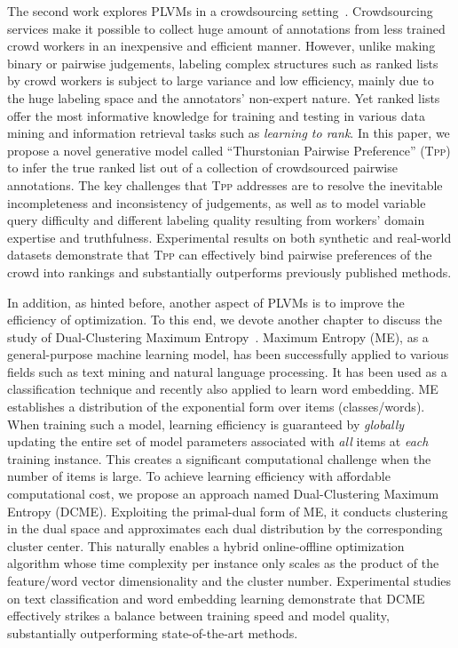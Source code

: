 The second work explores PLVMs in a crowdsourcing setting~\cite{wang2016tpp}.
Crowdsourcing services make it possible to collect huge amount of annotations
from less trained crowd workers in an inexpensive and efficient manner.
However, unlike making binary or pairwise judgements, labeling complex
structures such as ranked lists by crowd workers is subject to large variance
and low efficiency, mainly due to the huge labeling space and the annotators'
non-expert nature. Yet ranked lists offer the most informative knowledge for
training and testing in various data mining and information retrieval tasks such
as \textit{learning to rank}.  In this paper, we propose a novel generative
model called ``Thurstonian Pairwise Preference'' (\textsc{Tpp}) to infer the
true ranked list out of a collection of crowdsourced pairwise annotations.  The
key challenges that \textsc{Tpp} addresses are to resolve the inevitable
incompleteness and inconsistency of judgements, as well as to model variable
query difficulty and different labeling quality resulting from workers' domain
expertise and truthfulness.  Experimental results on both synthetic and
real-world datasets demonstrate that \textsc{Tpp} can effectively bind pairwise
preferences of the crowd into rankings and substantially outperforms previously
published methods.

In addition, as hinted before, another aspect of PLVMs is to improve the
efficiency of optimization. To this end, we devote another chapter to discuss
the study of Dual-Clustering Maximum Entropy~\cite{wang2016dcme}.  Maximum
Entropy (ME), as a general-purpose machine learning model, has been successfully
applied to various fields such as text mining and natural language processing.
It has been used as a classification technique and recently also applied to
learn word embedding. ME establishes a distribution of the exponential form over
items (classes/words). When training such a model, learning efficiency is
guaranteed by \emph{globally} updating the entire set of model parameters
associated with \emph{all} items at \emph{each} training instance. This creates
a significant computational challenge when the number of items is large. To
achieve learning efficiency with affordable computational cost, we propose an
approach named Dual-Clustering Maximum Entropy (DCME).  Exploiting the
primal-dual form of ME, it conducts clustering in the dual space and
approximates each dual distribution by the corresponding cluster center.  This
naturally enables a hybrid online-offline optimization algorithm whose time
complexity per instance only scales as the product of the feature/word vector
dimensionality and the cluster number. Experimental studies on text
classification and word embedding learning demonstrate that DCME effectively
strikes a balance between training speed and model quality, substantially
outperforming state-of-the-art methods.

